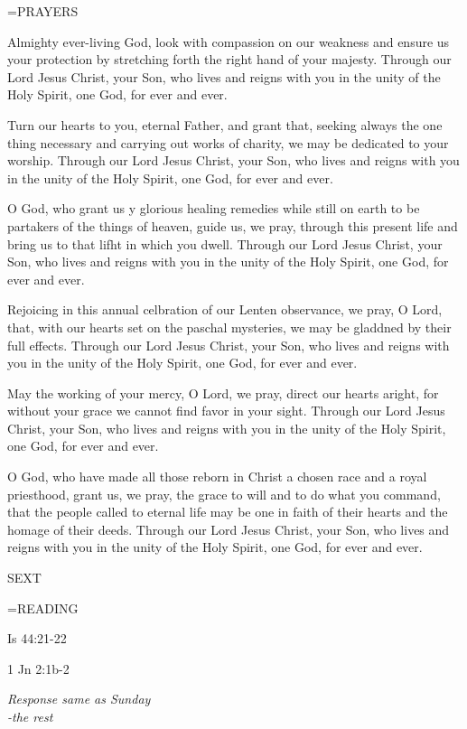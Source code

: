\hangindent=\parindent \small PRAYERS
\begin{description}[labelindent=\parindent, noitemsep, leftmargin=*]
\item [Saturday after Ash Wednesday:] 	Almighty ever-living God, look with compassion on our weakness and ensure us your protection by stretching forth the right hand of your majesty. Through our Lord Jesus Christ, your Son, who lives and reigns with you in the unity of the Holy Spirit, one God, for ever and ever.
\item [Week 1:] 	Turn our hearts to you, eternal Father, and grant that, seeking always the one thing necessary and carrying out works of charity, we may be dedicated to your worship. Through our Lord Jesus Christ, your Son, who lives and reigns with you in the unity of the Holy Spirit, one God, for ever and ever.
\item [Week 2:] 	O God, who grant us y glorious healing remedies while still on earth to be partakers of the things of heaven, guide us, we pray, through this present life and bring us to that lifht in which you dwell. Through our Lord Jesus Christ, your Son, who lives and reigns with you in the unity of the Holy Spirit, one God, for ever and ever.
\item [Week 3:] 	Rejoicing in this annual celbration of our Lenten observance, we pray, O Lord, that, with our hearts set on the paschal mysteries, we may be gladdned by their full effects. Through our Lord Jesus Christ, your Son, who lives and reigns with you in the unity of the Holy Spirit, one God, for ever and ever.
\item [Week 4:] 	May the working of your mercy, O Lord, we pray, direct our hearts aright, for without your grace we cannot find favor in your sight. Through our Lord Jesus Christ, your Son, who lives and reigns with you in the unity of the Holy Spirit, one God, for ever and ever.
\item [Week 5:] 	O God, who have made all those reborn in Christ a chosen race and a royal priesthood, grant us, we pray, the grace to will and to do what you command, that the people called to eternal life may be one in faith of their hearts and the homage of their deeds. Through our Lord Jesus Christ, your Son, who lives and reigns with you in the unity of the Holy Spirit, one God, for ever and ever.
\end{description}

\begin{flushleft}\normalsize SEXT\\\end{flushleft}

\hangindent=\parindent \small READING
\begin{description}[labelindent=\parindent, leftmargin=*]
\item [Saturday after Ash Wednesday \& Weeks 1-4:]     Is 44:21-22 \textbf{    }
\item [Week 5:]     1 Jn 2:1b-2 \textbf{    }
\end{description}


\begin{center}
\textit{Response same as Sunday\\
-the rest}
\end{center}

